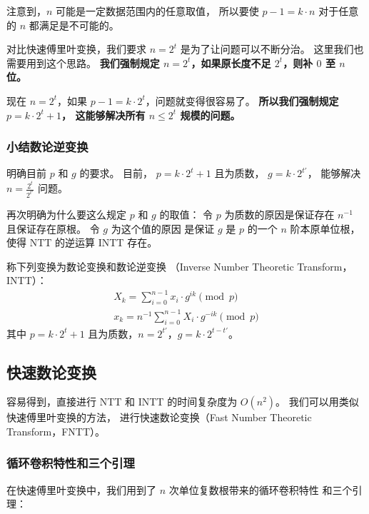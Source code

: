 \documentclass[12pt, UTF8]{article}
\begin{document}
    \bigskip
    注意到，$n$ 可能是一定数据范围内的任意取值，
    所以要使 $p - 1 = k · n$ 对于任意的 $n$ 都满足是不可能的。
    
    对比快速傅里叶变换，我们要求 $n = 2^t$ 是为了让问题可以不断分治。
    这里我们也需要用到这个思路。
    \textbf{我们强制规定 $n = 2^t$，如果原长度不足 $2^t$，则补 $0$ 至 $n$ 位。}

    现在 $n = 2^t$，如果 $p - 1 = k · 2^t$，问题就变得很容易了。
    \textbf{所以我们强制规定 $p = k · 2^t + 1$，
    这能够解决所有 $n \le 2^t$ 规模的问题。}

    \subsubsection{小结数论逆变换}
    明确目前 $p$ 和 $g$ 的要求。
    目前，
    $p = k · 2^t + 1$ 且为质数，
    $g = k · 2^{t'}$，
    能够解决 $n = \frac {2^t} {2^{t'}}$ 问题。
    
    再次明确为什么要这么规定 $p$ 和 $g$ 的取值：
    令 $p$ 为质数的原因是保证存在 $n^{-1}$
    且保证存在原根。
    令 $g$ 为这个值的原因
    是保证 $g$ 是 $p$ 的一个 $n$ 阶本原单位根，
    使得 NTT 的逆运算 INTT 存在。

    \bigskip
    称下列变换为数论变换和数论逆变换
    （Inverse Number Theoretic Transform，INTT）：
    \begin{gather*}
        X_k = \sum_{i = 0}^{n - 1} x_i · g^{ik} \pmod {p}
        \\
        x_k = n^{-1} \sum_{i = 0}^{n - 1} X_i · g^{-ik} \pmod {p}
    \end{gather*}
    其中 $p = k · 2^t + 1$ 且为质数，$n = 2^{t'}$，$g = k · 2^{t - t'}$。

    \subsection{快速数论变换}
    容易得到，直接进行 NTT 和 INTT 的时间复杂度为 $O(n^2)$。
    我们可以用类似快速傅里叶变换的方法，
    进行快速数论变换（Fast Number Theoretic Transform，FNTT）。
    
    \subsubsection{循环卷积特性和三个引理}
    在快速傅里叶变换中，我们用到了 $n$ 次单位复数根带来的循环卷积特性
    和三个引理：
    
    
    
\end{document}
